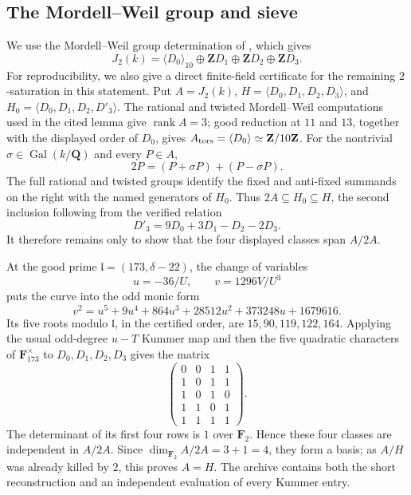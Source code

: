 \documentclass[11pt]{article}
\newcommand{\Q}{\mathbf Q}
\newcommand{\Z}{\mathbf Z}
\newcommand{\F}{\mathbf F}
\newcommand{\rank}{\operatorname{rank}}
\newcommand{\Gal}{\operatorname{Gal}}
\theoremstyle{definition}
\theoremstyle{remark}
\begin{document}
\subsection{The Mordell--Weil group and sieve}

We use the Mordell--Weil group determination of
\cite[Lemma~7.3]{DahmenSiksek}, which gives
\begin{equation}\label{eq:section7-MW}
 J_2(k)=\langle D_0\rangle_{10}
       \oplus\Z D_1\oplus\Z D_2\oplus\Z D_3.
\end{equation}
For reproducibility, we also give a direct finite-field certificate for the
remaining $2$-saturation in this statement.  Put
$A=J_2(k)$, $H=\langle D_0,D_1,D_2,D_3\rangle$, and
$H_0=\langle D_0,D_1,D_2,D'_3\rangle$.  The rational and twisted
Mordell--Weil computations used in the cited lemma give
$\rank A=3$; good reduction at $11$ and $13$, together with the displayed
order of $D_0$, gives $A_{\rm tors}=\langle D_0\rangle\simeq\Z/10\Z$.
For the nontrivial $\sigma\in\Gal(k/\Q)$ and every $P\in A$,
\[
                  2P=(P+\sigma P)+(P-\sigma P).
\]
The full rational and twisted groups identify the fixed and anti-fixed
summands on the right with the named generators of $H_0$.
Thus $2A\subseteq H_0\subseteq H$, the second inclusion following from
the verified relation
\[
                 D'_3=9D_0+3D_1-D_2-2D_3.
\]
It therefore remains only to show that the four displayed classes span
$A/2A$.

At the good prime $\mathfrak l=(173,\delta-22)$, the change of variables
\[
 u=-36/U,\qquad v=1296V/U^3
\]
puts the curve into the odd monic form
\[
 v^2=u^5+9u^4+864u^3+28512u^2+373248u+1679616.
\]
Its five roots modulo $\mathfrak l$, in the certified order, are
$15,90,119,122,164$.  Applying the usual odd-degree $u-T$ Kummer map and
then the five quadratic characters of $\F_{173}^{\times}$ to
$D_0,D_1,D_2,D_3$ gives the matrix
\[
 \begin{pmatrix}
 0&0&1&1\\
 1&0&1&1\\
 1&0&1&0\\
 1&1&0&1\\
 1&1&1&1
 \end{pmatrix}.
\]
The determinant of its first four rows is $1$ over $\F_2$.  Hence these
four classes are independent in $A/2A$.  Since
$\dim_{\F_2}A/2A=3+1=4$, they form a basis; as $A/H$ was already killed by
$2$, this proves $A=H$.  The archive contains both the short reconstruction
and an independent evaluation of every Kummer entry.
\end{document}
